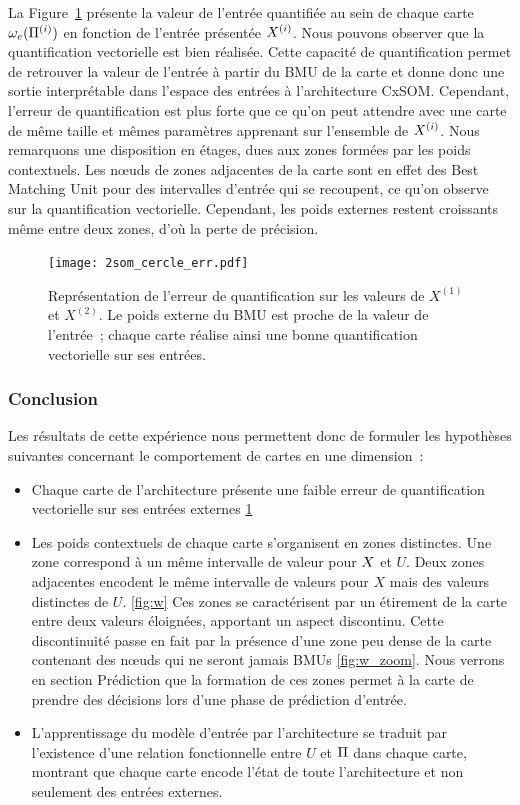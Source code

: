 \documentclass[../main]{subfiles}
\begin{document}
La Figure~\ref{fig:qv} présente la valeur de l'entrée quantifiée au sein de chaque carte $\omega_{e}(\Pi^{({i})})$ en fonction de l'entrée présentée $X^{({i})}$. Nous pouvons observer que la quantification vectorielle est bien réalisée. Cette capacité de quantification permet de retrouver la valeur de l'entrée à partir du BMU de la carte et donne donc une sortie interprétable dans l'espace des entrées à l'architecture CxSOM.
Cependant, l'erreur de quantification est plus forte que ce qu'on peut attendre avec une carte de même taille et mêmes paramètres apprenant sur l'ensemble de $X^{({i})}$. Nous remarquons une disposition en étages, dues aux zones formées par les poids contextuels.
Les n\oe{}uds de zones adjacentes de la carte sont en effet des Best Matching Unit pour des intervalles d'entrée qui se recoupent, ce qu'on observe sur la quantification vectorielle. Cependant, les poids externes restent croissants même entre deux zones, d'où la perte de précision. 

\begin{figure}
	\centering\texttt{[image: 2som\_cercle\_err.pdf]}
	\caption{Représentation de l'erreur de quantification sur les valeurs de $X^{(1)}$ et $X^{(2)}$. Le poids externe du BMU est proche de la valeur de l'entrée~; chaque carte réalise ainsi une bonne quantification vectorielle sur ses entrées. \label{fig:qv}}
\end{figure}

\subsubsection{Conclusion}

Les résultats de cette expérience nous permettent donc de formuler les hypothèses suivantes concernant le comportement de cartes en une dimension~:

\begin{itemize}
	\item Chaque carte de l'architecture présente une faible erreur de quantification vectorielle sur ses entrées externes \ref{fig:qv}
	\item Les poids contextuels de chaque carte s'organisent en zones distinctes. Une zone correspond à un même intervalle de valeur pour $X$ et $U$. Deux zones adjacentes encodent le même intervalle de valeurs pour $X$ mais des valeurs distinctes de $U$. \ref{fig:w} Ces zones se caractérisent par un étirement de la carte entre deux valeurs éloignées, apportant un aspect discontinu. Cette discontinuité passe en fait par la présence d'une zone peu dense de la carte contenant des n\oe{}uds qui ne seront jamais BMUs \ref{fig:w_zoom}. Nous verrons en section Prédiction que la formation de ces zones permet à la carte de prendre des décisions lors d'une phase de prédiction d'entrée.
	\item L'apprentissage du modèle d'entrée par l'architecture se traduit par l'existence d'une relation fonctionnelle entre $U$ et $\Pi$ dans chaque carte, montrant que chaque carte encode l'état de toute l'architecture et non seulement des entrées externes.
\end{itemize}
\end{document}
